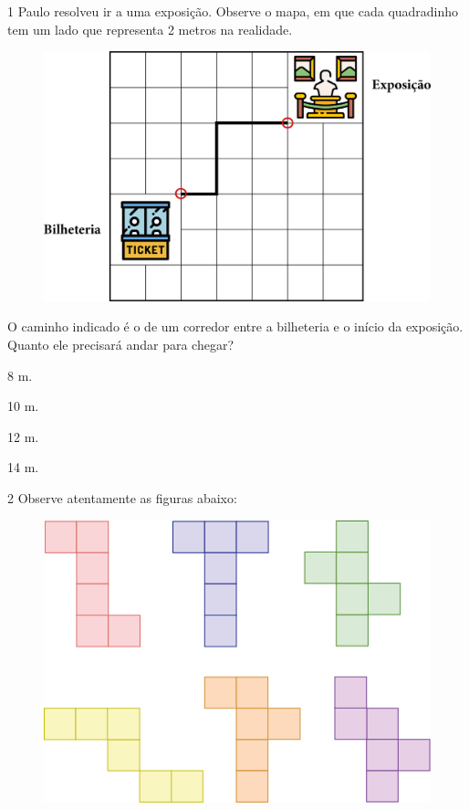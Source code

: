 
\num{1} Paulo resolveu ir a uma exposição. Observe o mapa, em que cada quadradinho tem um lado que representa 2 metros na realidade.

\begin{figure}[htpb!]
\centering
\includegraphics[width=\textwidth]{media/image35.png}
\end{figure}

O caminho indicado é o de um corredor entre a bilheteria e o início da exposição.
Quanto ele precisará andar para chegar?

\begin{escolha}
\item
  8 m.
\item
  10 m.
\item
  12 m.
\item
  14 m.
\end{escolha}

\pagebreak
\num{2} Observe atentamente as figuras abaixo:

\begin{figure}[htpb!]
\centering
\includegraphics[width=.7\textwidth]{media/image36.png}
\end{figure}

